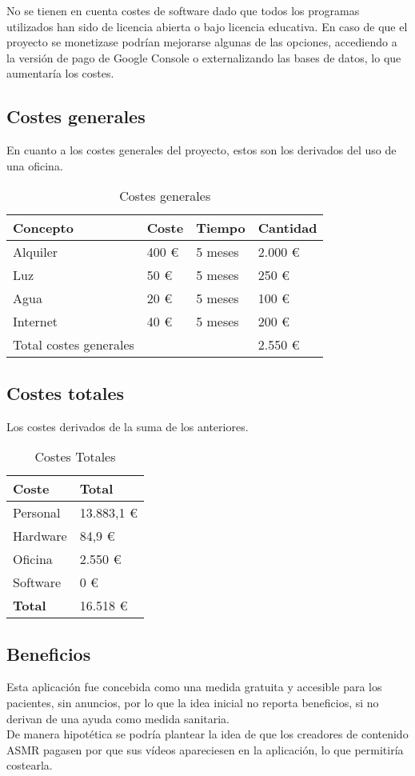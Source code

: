 \documentclass[a4paper,12pt,twoside]{memoir}
\begin{document}
No se tienen en cuenta costes de software dado que todos los programas utilizados han sido de licencia abierta o bajo licencia educativa. En caso de que el proyecto se monetizase podrían mejorarse algunas de las opciones, accediendo a la versión de pago de Google Console o externalizando las bases de datos, lo que aumentaría los costes.

\subsection{Costes generales}
En cuanto a los costes generales del proyecto, estos son los derivados del uso de una oficina.

\begin{table}[h!]
\centering
\begin{tabular}{llll}
\toprule
Concepto & Coste & Tiempo & Cantidad \\
\midrule
Alquiler & 400 € & 5 meses & 2.000 €\\
Luz & 50 € & 5 meses & 250 €\\
Agua & 20 € & 5 meses & 100 €\\
Internet & 40 € & 5 meses & 200 €\\
Total costes generales & & & 2.550 €\\
\end{tabular}
\caption{Costes generales}
\label{tabla-costes generales}
\end{table}

\subsection{Costes totales}
Los costes derivados de la suma de los anteriores.
\begin{table}[h!]
\centering
\begin{tabular}{ll}
\toprule
Coste & Total\\
\midrule
Personal & 13.883,1 €\\
Hardware & 84,9 €\\
Oficina & 2.550 €\\
Software & 0 €\\
\textbf{Total} & 16.518 €\\
\end{tabular}
\caption{Costes Totales}
\label{tabla-costes}
\end{table}
\subsection{Beneficios}
Esta aplicación fue concebida como una medida gratuita y accesible para los pacientes, sin anuncios, por lo que la idea inicial no reporta beneficios, si no derivan de una ayuda como medida sanitaria. \\
De manera hipotética se podría plantear la idea de que los creadores de contenido ASMR pagasen por que sus vídeos apareciesen en la aplicación, lo que permitiría costearla.
\end{document}

